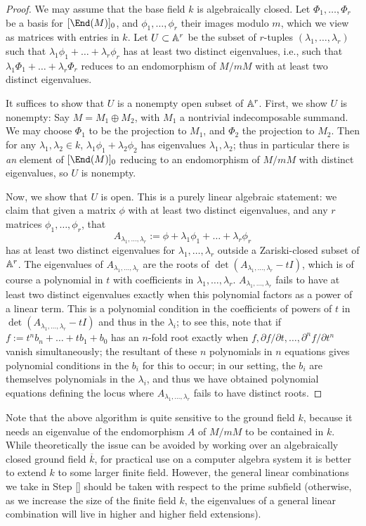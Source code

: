 \documentclass{article}
\let\l\lambda
\let\bar\overline
\numberwithin{equation}{section}
\let\d\partial
\theoremstyle{theorem}
\numberwithin{thm}{section}
\theoremstyle{definition}
\begin{document}
\begin{proof}
  We may assume that the base field $k$ is algebraically closed.
  Let $\Phi_1,\dots,\Phi_r$ be a basis for $[\End(M)]_0$, and $\phi_1,\dots,\phi_r$ their images modulo $m$, which we view as matrices with entries in $k$.
  Let $U\subset \mathbb A^r$ be the subset of $r$-tuples $(\l_1,\dots,\l_r)$ such that $\l_1\phi_1+\dots+\l_r\phi_r$ has at least two distinct eigenvalues, i.e., such that $\l_1\Phi_1+\dots+\l_r\Phi_r$ reduces to an endomorphism of $M/mM$ with at least two distinct eigenvalues.

  It suffices to show that $U$ is a nonempty open subset of $\mathbb A^r$. First, we show $U$ is nonempty:
  Say $M=M_1\oplus M_2$, with $M_1$ a nontrivial indecomposable summand. We may choose $\Phi_1$ to be the projection to $M_1$, and $\Phi_2$ the projection to $M_2$. Then for any $\l_1,\l_2\in k$, $\l_1\phi_1 + \l_2\phi_2$ has eigenvalues $\l_1,\l_2$; thus in particular there is \emph{an} element of $[\End(M)]_0$ reducing to an endomorphism of $M/mM$ with distinct eigenvalues, so $U$ is nonempty.

  Now, we show that $U$ is open. This is a purely linear algebraic statement: we claim that given a matrix $\phi$ with at least two distinct eigenvalues, and any $r$ matrices $\phi_1,\dots,\phi_r$, that
  $$ A_{\l_1,\dots,\l_r}:=\phi+\l_1\phi_1+\dots+\l_r\phi_r $$
  has at least two distinct eigenvalues for $\l_1,\dots,\l_r$ outside a Zariski-closed subset of $\mathbb A^r$.
  The eigenvalues of $A_{\l_1,\dots,\l_r}$ are the roots of $\det(A_{\l_1,\dots,\l_r}-t I)$, which is of course a polynomial in $t$ with coefficients in $\l_1,\dots,\l_r$. $A_{\l_1,\dots,\l_r}$ fails to have at least two distinct eigenvalues exactly when this polynomial factors as a power of a linear term. This is a polynomial condition in the coefficients of powers of $t$ in $\det(A_{\l_1,\dots,\l_r}-t I)$ and thus in the $\l_i$; to see this, note that if
  $ f:=t^n b_n +\dots +t b_1 +b_0 $
  has an $n$-fold root exactly when
  $ f,\d f/\d t,\dots, \d^n f/\d t^n $
  vanish simultaneously; the resultant of these $n$ polynomials in $n$ equations gives polynomial conditions in the $b_i$ for this to occur; in our setting, the $b_i$ are themselves polynomials in the $\l_i$, and thus we have obtained polynomial equations defining the locus where $A_{\l_1,\dots,\l_r}$ fails to have distinct roots.
\end{proof}


\begin{rem}
  Note that the above algorithm is quite sensitive to the ground field $k$, because it needs an eigenvalue of the endomorphism $A$ of $M/mM$ to be contained in $k$. While theoretically the issue can be avoided by working over an algebraically closed ground field $\bar k$, for practical use on a computer algebra system it is better to extend $k$ to some larger finite field. However, the general linear combinations we take in Step \ref{} should be taken with respect to the prime subfield (otherwise, as we increase the size of the finite field $k$, the eigenvalues of a general linear combination will live in higher and higher field extensions).
\end{rem}
\end{document}
